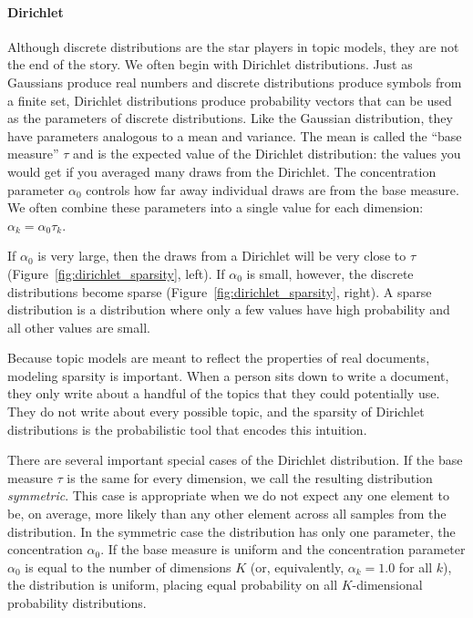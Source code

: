\paragraph{Dirichlet}
Although discrete distributions are the star players in topic models, they are
not the end of the story.  We often begin with Dirichlet distributions.
Just as Gaussians produce real numbers and discrete distributions produce symbols from a finite set, Dirichlet distributions produce probability vectors that can be used as the parameters of discrete distributions.
Like the Gaussian distribution, they have parameters analogous to a mean and
variance.  The mean is called the ``base measure'' $\tau$ and is the expected
value of the Dirichlet distribution: the values you would get if you averaged many draws from the
Dirichlet.  The concentration parameter $\alpha_0$ controls how far away individual draws are from the base measure.
We often combine these parameters into a single value for each dimension: $\alpha_k = \alpha_0 \tau_k$.

If $\alpha_0$ is very large, then the draws from a Dirichlet will be very close to
$\tau$ (Figure~\ref{fig:dirichlet_sparsity}, left).  If $\alpha_0$ is
small, however, the discrete distributions become sparse
(Figure~\ref{fig:dirichlet_sparsity}, right).  A sparse distribution is a
distribution where only a few values have high probability and all other values are small.

Because topic models are meant to reflect the properties of real documents, modeling sparsity is important.  When a person sits down to write a document, they only
write about a handful of the topics that they could potentially use.  They do not write about every possible topic, and the sparsity of Dirichlet distributions is the probabilistic
tool that encodes this intuition.

There are several important special cases of the Dirichlet distribution.
If the base measure $\tau$ is the same for every dimension, we call the resulting distribution {\em symmetric}.
This case is appropriate when we do not expect any one element to be, on average, more likely than any other element across all samples from the distribution.
In the symmetric case the  distribution has only one parameter, the concentration $\alpha_0$.
If the base measure is uniform and the concentration parameter $\alpha_0$ is equal to the number of dimensions $K$ (or, equivalently, $\alpha_k = 1.0$ for all $k$), the distribution is uniform, placing equal probability on all $K$-dimensional probability distributions.


